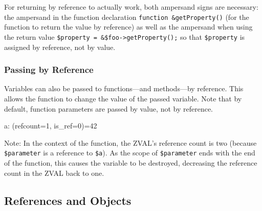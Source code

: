 

For returning by reference to actually work, both ampersand signs are necessary: the ampersand in the function declaration \texttt{function \&getProperty()} (for the function to return the value by reference) as well as the ampersand when using the return value \texttt{\$property = \&\$foo->getProperty();} so that \texttt{\$property} is assigned by reference, not by value.


\subsubsection{Passing by Reference}

Variables can also be passed to functions---and methods---by reference. \cite{php-manual-passing-by-reference} This allows the function to change the value of the passed variable. Note that by default, function parameters are passed by value, not by reference.


\begin{textcode}
a: (refcount=1, is_ref=0)=42
\end{textcode}

Note: In the context of the function, the ZVAL's reference count is two (because \texttt{\$parameter} is a reference to \texttt{\$a}). As the scope of \texttt{\$parameter} ends with the end of the function, this causes the variable to be destroyed, decreasing the reference count in the ZVAL back to one.


\subsection{References and Objects}

